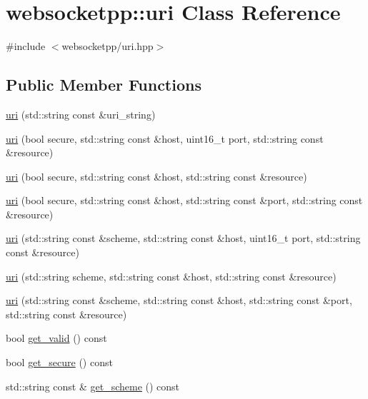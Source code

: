 \hypertarget{classwebsocketpp_1_1uri}{}\section{websocketpp\+:\+:uri Class Reference}
\label{classwebsocketpp_1_1uri}


{\ttfamily \#include $<$websocketpp/uri.\+hpp$>$}

\subsection*{Public Member Functions}
\begin{DoxyCompactItemize}
\item 
\hyperlink{classwebsocketpp_1_1uri_a8cb22ae92e3e49c4351a3f873a9b279d}{uri} (std\+::string const \&uri\+\_\+string)
\item 
\hyperlink{classwebsocketpp_1_1uri_a3c133d45cf2ebb1859e7113b2b9d44b3}{uri} (bool secure, std\+::string const \&host, uint16\+\_\+t port, std\+::string const \&resource)
\item 
\hyperlink{classwebsocketpp_1_1uri_ae7bfd18657c73695a4ff58318e02066a}{uri} (bool secure, std\+::string const \&host, std\+::string const \&resource)
\item 
\hyperlink{classwebsocketpp_1_1uri_a0d1197614a15afedca9fdfd1bfef3d85}{uri} (bool secure, std\+::string const \&host, std\+::string const \&port, std\+::string const \&resource)
\item 
\hyperlink{classwebsocketpp_1_1uri_a9019b4a2e3de42a822f2e37baa332c9e}{uri} (std\+::string const \&scheme, std\+::string const \&host, uint16\+\_\+t port, std\+::string const \&resource)
\item 
\hyperlink{classwebsocketpp_1_1uri_a2cf8998d357854ed3ce5fd8cb38742a5}{uri} (std\+::string scheme, std\+::string const \&host, std\+::string const \&resource)
\item 
\hyperlink{classwebsocketpp_1_1uri_a162349184bbc29a4d30f6fc50969e6e6}{uri} (std\+::string const \&scheme, std\+::string const \&host, std\+::string const \&port, std\+::string const \&resource)
\item 
bool \hyperlink{classwebsocketpp_1_1uri_af0fbbe278e9fe8ee5926f1a7903f31f9}{get\+\_\+valid} () const 
\item 
bool \hyperlink{classwebsocketpp_1_1uri_aab892e879dc0fca398cb1e1ef16b574d}{get\+\_\+secure} () const 
\item 
std\+::string const \& \hyperlink{classwebsocketpp_1_1uri_a16b5a63f97a50b49864e96d361810c88}{get\+\_\+scheme} () const 

\end{DoxyCompactItemize}
